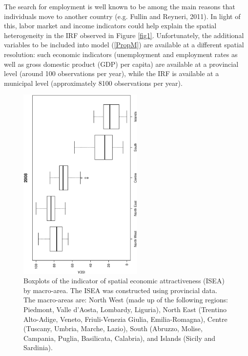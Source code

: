 \documentclass[12pt]{article}
\theoremstyle{definition}
\theoremstyle{plain}
\begin{document}
The search for employment is well known to be among the main reasons that individuals move to another country (e.g. Fullin and Reyneri, 2011). In light of this, labor market and income indicators could help explain the spatial heterogeneity in the IRF observed in Figure \ref{fig1}. Unfortunately, the additional variables to be included into model (\ref{PropM}) are available at a different spatial resolution: such economic indicators (unemployment and employment rates as well as gross domestic product (GDP) per capita) are available at a provincial level (around 100 observations per year), while the IRF is available at a municipal level (approximately 8100 observations per year). 

\begin{figure}[tbp]
\centering
	\includegraphics[width=0.55\textwidth, angle=270]{boxplot.eps}
\caption{Boxplots of the indicator of spatial economic attractiveness (ISEA) by macro-area. The ISEA was constructed using provincial data. The macro-areas are: North West (made up of the following regions: Piedmont, Valle d'Aosta, Lombardy, Liguria), North East (Trentino Alto-Adige, Veneto, Friuli-Venezia Giulia, Emilia-Romagna), Centre (Tuscany, Umbria, Marche, Lazio), South (Abruzzo, Molise, Campania, Puglia, Basilicata, Calabria), and Islands (Sicily and Sardinia).}
	\label{fig3}
\end{figure} 
\end{document}
